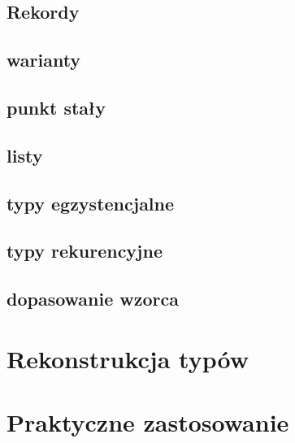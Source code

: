 \documentclass[11pt,leqno]{article}
\begin{document}
\subsection{Rekordy}
\subsection{warianty}
\subsection{punkt stały}
\subsection{listy}
\subsection{typy egzystencjalne}
\subsection{typy rekurencyjne}
\subsection{dopasowanie wzorca}


\section{Rekonstrukcja typów}


\section{Praktyczne zastosowanie}                       
\setcounter{equation}{0}


\end{document}
